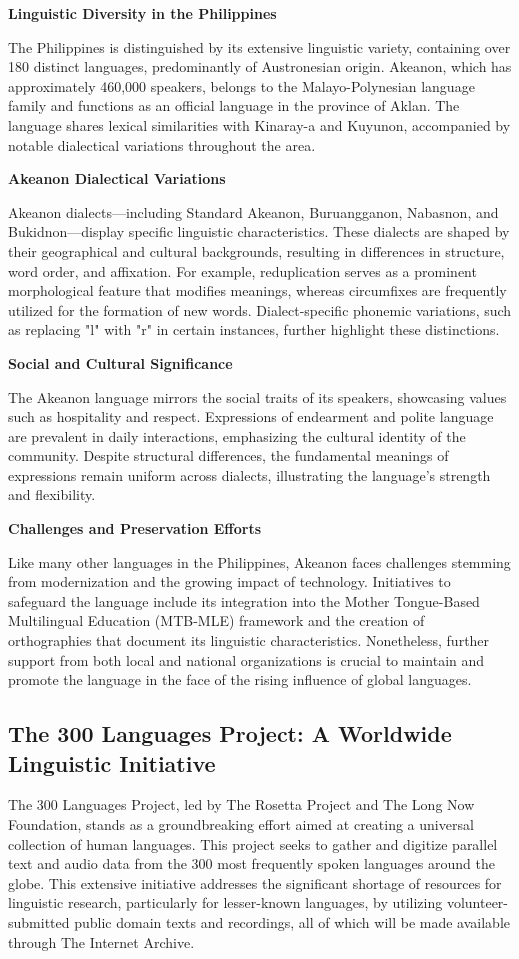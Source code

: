\textbf{Linguistic Diversity in the Philippines}

The Philippines is distinguished by its extensive linguistic variety, containing over 180 distinct languages, predominantly of Austronesian origin. Akeanon, which has approximately 460,000 speakers, belongs to the Malayo-Polynesian language family and functions as an official language in the province of Aklan. The language shares lexical similarities with Kinaray-a and Kuyunon, accompanied by notable dialectical variations throughout the area.

\textbf{Akeanon Dialectical Variations}

Akeanon dialects—including Standard Akeanon, Buruangganon, Nabasnon, and Bukidnon—display specific linguistic characteristics. These dialects are shaped by their geographical and cultural backgrounds, resulting in differences in structure, word order, and affixation. For example, reduplication serves as a prominent morphological feature that modifies meanings, whereas circumfixes are frequently utilized for the formation of new words. Dialect-specific phonemic variations, such as replacing "l" with "r" in certain instances, further highlight these distinctions.

\textbf{Social and Cultural Significance}

The Akeanon language mirrors the social traits of its speakers, showcasing values such as hospitality and respect. Expressions of endearment and polite language are prevalent in daily interactions, emphasizing the cultural identity of the community. Despite structural differences, the fundamental meanings of expressions remain uniform across dialects, illustrating the language’s strength and flexibility.

\textbf{Challenges and Preservation Efforts}

Like many other languages in the Philippines, Akeanon faces challenges stemming from modernization and the growing impact of technology. Initiatives to safeguard the language include its integration into the Mother Tongue-Based Multilingual Education (MTB-MLE) framework and the creation of orthographies that document its linguistic characteristics. Nonetheless, further support from both local and national organizations is crucial to maintain and promote the language in the face of the rising influence of global languages.

\subsection{The 300 Languages Project: A Worldwide Linguistic Initiative}
The 300 Languages Project, led by The Rosetta Project and The Long Now Foundation, stands as a groundbreaking effort aimed at creating a universal collection of human languages. This project seeks to gather and digitize parallel text and audio data from the 300 most frequently spoken languages around the globe. This extensive initiative addresses the significant shortage of resources for linguistic research, particularly for lesser-known languages, by utilizing volunteer-submitted public domain texts and recordings, all of which will be made available through The Internet Archive.

